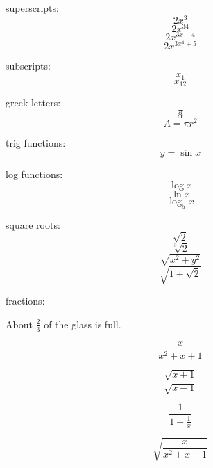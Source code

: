 \documentclass[11pt]{article}
\begin{document}
superscripts: $$2x^3$$
$$2x^{34}$$
$$2x^{3x+4}$$
$$2x^{3x^4+5}$$

subscripts:
$$x_1$$
$$x_{12}$$

greek letters:
$$\pi$$
$$\alpha$$
$$A=\pi r^2$$

trig functions:
$$y=\sin{x}$$

log functions:
$$\log{x}$$
$$\ln{x}$$
$$\log_5{x}$$

square roots:
$$\sqrt{2}$$
$$\sqrt[3]{2}$$
$$\sqrt{x^2+y^2}$$
$$\sqrt{1+\sqrt{2}}$$

fractions:

About $\displaystyle{\frac{2}{3}}$ of the glass is full.

$$\frac{x}{x^2+x+1}$$

$$\frac{\sqrt{x+1}}{\sqrt{x-1}}$$

$$\frac{1}{1+\frac{1}{x}}$$

$$\sqrt{\frac{x}{x^2+x+1}}$$
\end{document}
